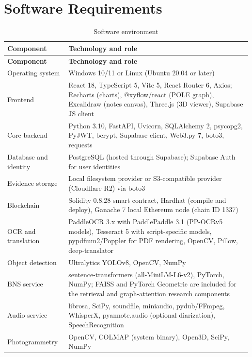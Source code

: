 \documentclass[12pt,a4paper,oneside]{report}
\begin{document}
\section{Software Requirements}
{\footnotesize
\setlength{\tabcolsep}{3pt}
\renewcommand{\arraystretch}{1.15}
\begin{longtable}{|>{\raggedright\arraybackslash}p{3.41cm}|>{\raggedright\arraybackslash}p{10.79cm}|}
\caption{Software environment}\\
\hline
\rowcolor{headfill}\textbf{Component} & \textbf{Technology and role} \\ \hline
\endfirsthead
\hline
\rowcolor{headfill}\textbf{Component} & \textbf{Technology and role} \\ \hline
\endhead
\hline \endfoot
Operating system & Windows 10/11 or Linux (Ubuntu 20.04 or later) \\ \hline
Frontend & React 18, TypeScript 5, Vite 5, React Router 6, Axios; Recharts (charts), @xyflow/react (POLE graph), Excalidraw (notes canvas), Three.js (3D viewer), Supabase JS client \\ \hline
Core backend & Python 3.10, FastAPI, Uvicorn, SQLAlchemy 2, psycopg2, PyJWT, bcrypt, Supabase client, Web3.py 7, boto3, requests \\ \hline
Database and identity & PostgreSQL (hosted through Supabase); Supabase Auth for user identities \\ \hline
Evidence storage & Local filesystem provider or S3-compatible provider (Cloudflare R2) via boto3 \\ \hline
Blockchain & Solidity 0.8.28 smart contract, Hardhat (compile and deploy), Ganache 7 local Ethereum node (chain ID 1337) \\ \hline
OCR and translation & PaddleOCR 3.x with PaddlePaddle 3.1 (PP-OCRv5 models), Tesseract 5 with script-specific models, pypdfium2/Poppler for PDF rendering, OpenCV, Pillow, deep-translator \\ \hline
Object detection & Ultralytics YOLOv8, OpenCV, NumPy \\ \hline
BNS service & sentence-transformers (all-MiniLM-L6-v2), PyTorch, NumPy; FAISS and PyTorch Geometric are included for the retrieval and graph-attention research components \\ \hline
Audio service & librosa, SciPy, soundfile, miniaudio, pydub/FFmpeg, WhisperX, pyannote.audio (optional diarization), SpeechRecognition \\ \hline
Photogrammetry & OpenCV, COLMAP (system binary), Open3D, SciPy, NumPy \\ \hline
\end{longtable}
}
\end{document}
